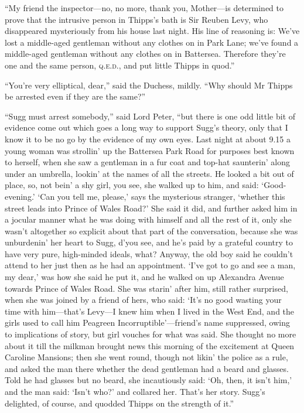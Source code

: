 \enquote{My friend the inspector\allowbreak---\allowbreak no, no more, thank you, Mother\allowbreak---\allowbreak is determined to prove that the intrusive person in Thipps’s bath is Sir Reuben Levy, who disappeared mysteriously from his house last night. His line of reasoning is: We’ve lost a middle-aged gentleman without any clothes on in Park Lane; we’ve found a middle-aged gentleman without any clothes on in Battersea. Therefore they’re one and the same person, \textsc{q.e.d.}, and put little Thipps in quod.}

\enquote{You’re very elliptical, dear,} said the Duchess, mildly. \enquote{Why should Mr Thipps be arrested even if they are the same?}

\enquote{Sugg must arrest somebody,} said Lord Peter, \enquote{but there is one odd little bit of evidence come out which goes a long way to support Sugg’s theory, only that I know it to be no go by the evidence of my own eyes. Last night at about 9.15 a young woman was strollin’ up the Battersea Park Road for purposes best known to herself, when she saw a gentleman in a fur coat and top-hat saunterin’ along under an umbrella, lookin’ at the names of all the streets. He looked a bit out of place, so, not bein’ a shy girl, you see, she walked up to him, and said: \enquote{Good-evening.} \enquote{Can you tell me, please,} says the mysterious stranger, \enquote{whether this street leads into Prince of Wales Road?} She said it did, and further asked him in a jocular manner what he was doing with himself and all the rest of it, only she wasn’t altogether so explicit about that part of the conversation, because she was unburdenin’ her heart to Sugg, d’you see, and he’s paid by a grateful country to have very pure, high-minded ideals, what? Anyway, the old boy said he couldn’t attend to her just then as he had an appointment. \enquote{I’ve got to go and see a man, my dear,} was how she said he put it, and he walked on up Alexandra Avenue towards Prince of Wales Road. She was starin’ after him, still rather surprised, when she was joined by a friend of hers, who said: \enquote{It’s no good wasting your time with him\allowbreak---\allowbreak that’s Levy\allowbreak---\allowbreak I knew him when I lived in the West End, and the girls used to call him Peagreen Incorruptible}---friend’s name suppressed, owing to implications of story, but girl vouches for what was said. She thought no more about it till the milkman brought news this morning of the excitement at Queen Caroline Mansions; then she went round, though not likin’ the police as a rule, and asked the man there whether the dead gentleman had a beard and glasses. Told he had glasses but no beard, she incautiously said: \enquote{Oh, then, it isn’t him,} and the man said: \enquote{Isn’t who?} and collared her. That’s her story. Sugg’s delighted, of course, and quodded Thipps on the strength of it.}

